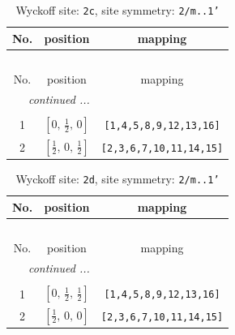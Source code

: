 \documentclass[fleqn,8pt]{jsarticle}
\begin{document}
\renewcommand{\arraystretch}{1.2}
\begin{longtable}{ccc}
\caption{Wyckoff site: {\tt 2c}, site symmetry: {\tt 2/m..1'}}
 \\
 \hline \hline
No. & position & mapping \\ \hline \endfirsthead

\multicolumn{2}{l}{\tablename\ \thetable{}} \\
 \hline \hline
No. & position & mapping \\ \hline \endhead

 \hline \hline
\multicolumn{2}{r}{\footnotesize\it continued ...} \\ \endfoot

 \hline \hline
\multicolumn{2}{r}{} \\ \endlastfoot

1 & $\left[ 0,\, \frac{1}{2},\, 0 \right]$ & {\tt [1,4,5,8,9,12,13,16]} \\ \hline
2 & $\left[ \frac{1}{2},\, 0,\, \frac{1}{2} \right]$ & {\tt [2,3,6,7,10,11,14,15]} \\
\end{longtable}
\renewcommand{\arraystretch}{1.2}
\begin{longtable}{ccc}
\caption{Wyckoff site: {\tt 2d}, site symmetry: {\tt 2/m..1'}}
 \\
 \hline \hline
No. & position & mapping \\ \hline \endfirsthead

\multicolumn{2}{l}{\tablename\ \thetable{}} \\
 \hline \hline
No. & position & mapping \\ \hline \endhead

 \hline \hline
\multicolumn{2}{r}{\footnotesize\it continued ...} \\ \endfoot

 \hline \hline
\multicolumn{2}{r}{} \\ \endlastfoot

1 & $\left[ 0,\, \frac{1}{2},\, \frac{1}{2} \right]$ & {\tt [1,4,5,8,9,12,13,16]} \\ \hline
2 & $\left[ \frac{1}{2},\, 0,\, 0 \right]$ & {\tt [2,3,6,7,10,11,14,15]} \\
\end{longtable}
\renewcommand{\arraystretch}{1.2}
\end{document}
